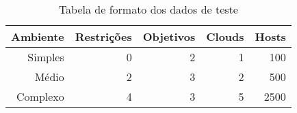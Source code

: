 \begin{table}[!htb]
    \centering
    \caption[Formato dos dados de teste]{Tabela de formato dos dados de teste
    \label{tab:testdata-info}}
    \begin{tabular}{rrrrr}
        \toprule
            Ambiente & Restrições & Objetivos & Clouds & Hosts \\ 
        \midrule
            Simples & 0 & 2 & 1 & 100 \\
            Médio & 2 & 3 & 2 & 500 \\
            Complexo & 4 & 3 & 5 & 2500 \\
        \bottomrule
    \end{tabular}
\end{table}
